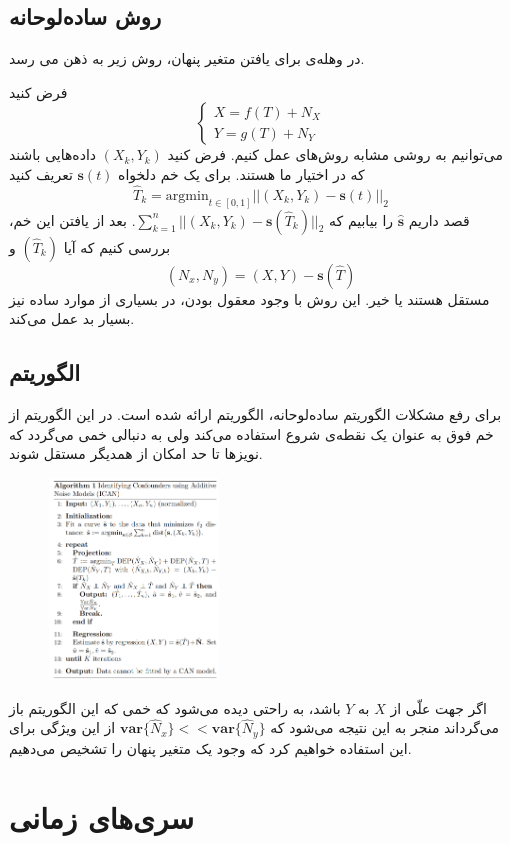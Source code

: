 \documentclass[a4paper,12pt]{article}
\def\hat{\widehat}
\begin{document}
\subsection{روش ساده‌لوحانه}
در وهله‌ی برای یافتن متغیر‌ پنهان، روش زیر به ذهن می رسد.

 فرض کنید 
	\begin{equation*}
	\begin{cases}
	X = f(T) + N_X\\
	Y = g(T) + N_Y
	\end{cases}
	\end{equation*}
می‌توانیم به روشی مشابه روش‌های
عمل کنیم. فرض کنید $(X_k, Y_k)$ داده‌هایی باشند که در اختیار ما هستند. برای یک خم دلخواه 
$\mathbf{s}(t)$
تعریف کنید
$$\hat{T}_k = \mathrm{argmin}_{t\in[0,1]} ||(X_k, Y_k) - \mathbf{s}(t)||_2$$ 
قصد داریم 
$\hat{\mathbf{s}}$ 
را بیابیم که
$\sum^n_{k=1} ||(X_k, Y_k) - \mathbf{s}(\hat{T}_k)||_2$. 
بعد از یافتن این خم، بررسی کنیم که آیا $(\hat{T}_k)$
و
$$(N_x, N_y) = (X, Y) - \mathbf{s}(\hat{T})$$
مستقل هستند یا خیر. این روش با وجود معقول بودن، در بسیاری از موارد ساده نیز بسیار بد عمل می‌کند.
\subsection{الگوریتم }
برای رفع مشکلات الگوریتم ساده‌لوحانه، الگوریتم
ارائه شده است. در این الگوریتم از خم فوق به عنوان یک نقطه‌ی شروع استفاده می‌کند ولی به دنبالی خمی می‌گردد که نویز‌ها تا حد امکان از همدیگر مستقل شوند. 

\begin{figure}[h!]
	\begin{center}
		\includegraphics[width=0.4\textwidth]{ican.png}
	\end{center}
\end{figure}
اگر جهت علّی از $X$ به $Y$ باشد، به راحتی دیده ‌می‌شود که خمی که این الگوریتم باز می‌گرداند منجر به این نتیجه می‌شود که 
$\mathbf{var}\{\hat{N}_x\}<<\mathbf{var}\{\hat{N}_y\}$
از این ویژگی برای این استفاده خواهیم کرد که وجود یک متغیر پنهان را تشخیص می‌دهیم.

\section{سری‌های زمانی}


\end{document}
